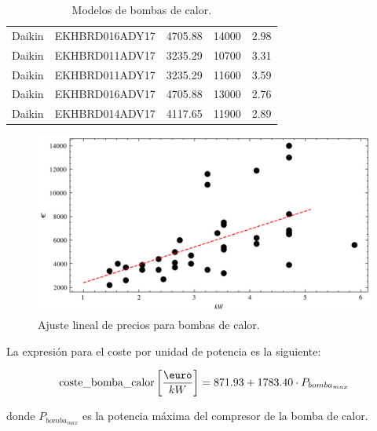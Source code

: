 \begin{table}[htbp]
\begin{tabular}{llrrr}
		Daikin     & EKHBRD016ADY17 & 4705.88                           & 14000          & 2.98      \\
		Daikin     & EKHBRD011ADV17 & 3235.29                           & 10700          & 3.31      \\
		Daikin     & EKHBRD011ADY17 & 3235.29                           & 11600          & 3.59      \\
		Daikin     & EKHBRD016ADV17 & 4705.88                           & 13000          & 2.76      \\
		Daikin     & EKHBRD014ADV17 & 4117.65                           & 11900          & 2.89      \\
		\bottomrule
	\end{tabular}
	\caption{Modelos de bombas de calor.}
	\label{tab:heat_pump_data}
\end{table}


\begin{figure}[h] \centering
	\centering
	\includegraphics[width=1\textwidth]{./capitulos/adquisicion_de_datos/images/heat_pump_regression.png}
	\caption{Ajuste lineal de precios para bombas de calor.}
	\label{fig:heat_pump_regression}
\end{figure}


La expresión para el coste por unidad de potencia es la siguiente:

\begin{equation}
	\text{coste\_bomba\_calor} \left[\frac{\text{\euro}}{kW}\right] = 871.93 + 1783.40 \cdot P_{bomba_{max}}
\end{equation}

donde $P_{bomba_{max}}$ es la potencia máxima del compresor de la bomba de calor.
